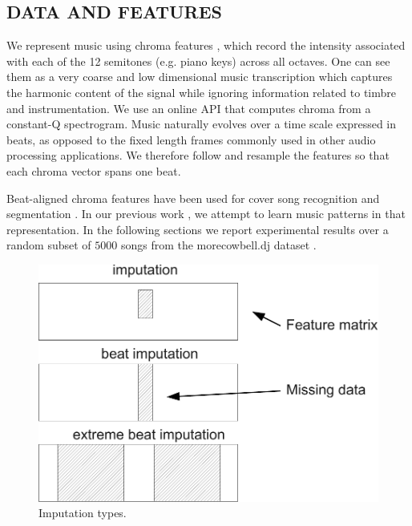 \documentclass{article}
\begin{document}
\subsection{DATA AND FEATURES}
\label{ssec:feats}
We represent music using chroma features \cite{Ellis2007a}, which
record the intensity associated with each of the 12 semitones
(e.g. piano keys) across all octaves.  One can see them as a very
coarse %
and low dimensional music transcription which captures the
harmonic content of the signal while ignoring information related to
timbre and instrumentation.
We use an online API \cite{EchoNest} that computes
chroma from a constant-Q spectrogram.
%
Music naturally evolves over a time scale expressed in beats, as
opposed to the fixed length frames commonly used in other audio
processing applications.
We therefore follow
\cite{Ellis2007a} and
resample the features so that each chroma vector spans one beat.

Beat-aligned chroma features have been used for cover song recognition
\cite{Ellis2007a} and segmentation \cite{Weiss2010}. In our previous work
\cite{Bertin-Mahieux2010a}, we attempt to learn music patterns in that
representation.
In the following sections we report experimental results over 
a random
subset of $5000$ songs from the morecowbell.dj dataset
\cite{Bertin-Mahieux2010a}.


\begin{figure}[t]
\begin{center}
\includegraphics[width=.7\columnwidth]{type_imputation}
\end{center}
\caption{Imputation types.
\label{fig:types}}
\end{figure}
\end{document}
